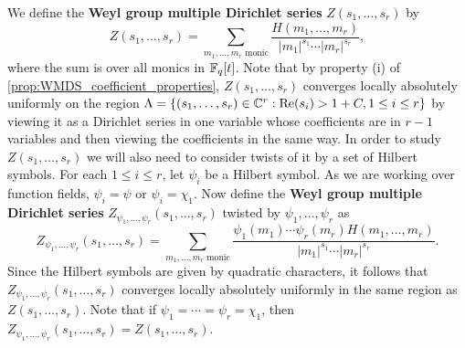 \documentclass[12pt,reqno,oneside]{amsart}
\begin{document}
    We define the \textbf{Weyl group multiple Dirichlet series} $Z(s_{1},\ldots,s_{r})$ by
    \[
        Z(s_{1},\ldots,s_{r}) = \sum_{\text{$m_{1},\ldots,m_{r}$ monic}}\frac{H(m_{1},\ldots,m_{r})}{|m_{1}|^{s_{1}} \cdots |m_{r}|^{s_{r}}},
    \]
    where the sum is over all monics in $\mathbb{F}_{q}[t]$. Note that by property (i) of \cref{prop:WMDS_coefficient_properties}, $Z(s_{1},\ldots,s_{r})$ converges locally absolutely uniformly on the region $\Lambda = \{(s_{1},\ldots,s_{r}) \in \mathbb{C}^{r}:\mathrm{Re}(s_{i}) > 1+C, 1 \le i \le r\}$ by viewing it as a Dirichlet series in one variable whose coefficients are in $r-1$ variables and then viewing the coefficients in the same way. In order to study $Z(s_{1},\ldots,s_{r})$ we will also need to consider twists of it by a set of Hilbert symbols. For each $1 \le i \le r$, let $\psi_{i}$ be a Hilbert symbol. As we are working over function fields, $\psi_{i} = \psi$ or $\psi_{i} = \chi_{1}$. Now define the \textbf{Weyl group multiple Dirichlet series} $Z_{\psi_{1},\ldots,\psi_{r}}(s_{1},\ldots,s_{r})$ twisted by $\psi_{1},\ldots,\psi_{r}$ as
    \[
        Z_{\psi_{1},\ldots,\psi_{r}}(s_{1},\ldots,s_{r}) = \sum_{\text{$m_{1},\ldots,m_{r}$ monic}}\frac{\psi_{1}(m_{1}) \cdots \psi_{r}(m_{r})H(m_{1},\ldots,m_{r})}{|m_{1}|^{s_{1}} \cdots |m_{r}|^{s_{r}}}.
    \]
    Since the Hilbert symbols are given by quadratic characters, it follows that $Z_{\psi_{1},\ldots,\psi_{r}}(s_{1},\ldots,s_{r})$ converges locally absolutely uniformly in the same region as $Z(s_{1},\ldots,s_{r})$. Note that if $\psi_{1} = \cdots = \psi_{r} = \chi_{1}$, then $Z_{\psi_{1},\ldots,\psi_{r}}(s_{1},\ldots,s_{r}) = Z(s_{1},\ldots,s_{r})$.
\end{document}
